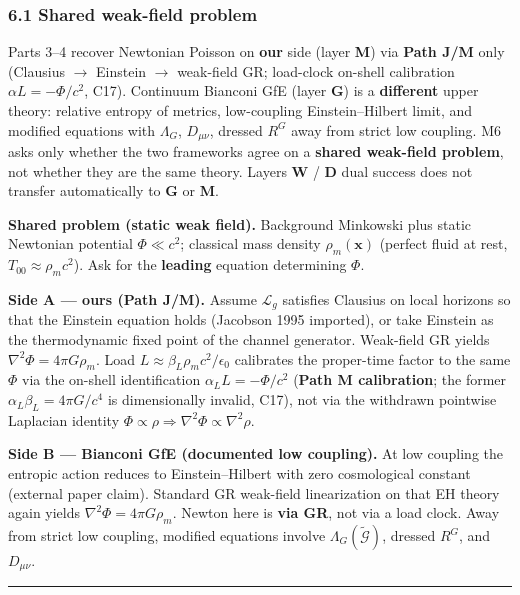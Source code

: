 \documentclass[
  11pt,
]{article}
\begin{document}
\subsubsection{6.1 Shared weak-field
problem}\label{shared-weak-field-problem}

Parts 3--4 recover Newtonian Poisson on \textbf{our} side (layer
\textbf{M}) via \textbf{Path J/M} only (Clausius $\to$ Einstein $\to$ weak-field
GR; load-clock on-shell calibration \(\alpha L=-\Phi/c^2\), C17).
Continuum Bianconi GfE (layer \textbf{G}) is a \textbf{different} upper
theory: relative entropy of metrics, low-coupling Einstein--Hilbert
limit, and modified equations with \(\Lambda_G\), \(D_{\mu\nu}\),
dressed \(R^G\) away from strict low coupling. M6 asks only whether the
two frameworks agree on a \textbf{shared weak-field problem}, not
whether they are the same theory. Layers \textbf{W} / \textbf{D} dual
success does not transfer automatically to \textbf{G} or \textbf{M}.

\textbf{Shared problem (static weak field).} Background Minkowski plus
static Newtonian potential \(\Phi\ll c^2\); classical mass density
\(\rho_m(\mathbf{x})\) (perfect fluid at rest,
\(T_{00}\approx\rho_m c^2\)). Ask for the \textbf{leading} equation
determining \(\Phi\).

\textbf{Side A --- ours (Path J/M).} Assume \(\mathcal{L}_g\) satisfies
Clausius on local horizons so that the Einstein equation holds (Jacobson
1995 imported), or take Einstein as the thermodynamic fixed point of the
channel generator. Weak-field GR yields \(\nabla^2\Phi=4\pi G\rho_m\).
Load \(L\approx\beta_L\rho_m c^2/\epsilon_0\) calibrates the proper-time
factor to the same \(\Phi\) via the on-shell identification
\(\alpha_L L=-\Phi/c^2\) (\textbf{Path M calibration}; the former
\(\alpha_L\beta_L=4\pi G/c^4\) is dimensionally invalid, C17), not via
the withdrawn pointwise Laplacian identity
\(\Phi\propto\rho\Rightarrow\nabla^2\Phi\propto\nabla^2\rho\).

\textbf{Side B --- Bianconi GfE (documented low coupling).} At low
coupling the entropic action reduces to Einstein--Hilbert with zero
cosmological constant (external paper claim). Standard GR weak-field
linearization on that EH theory again yields
\(\nabla^2\Phi=4\pi G\rho_m\). Newton here is \textbf{via GR}, not via a
load clock. Away from strict low coupling, modified equations involve
\(\Lambda_G(\tilde{\mathcal{G}})\), dressed \(R^G\), and \(D_{\mu\nu}\).

\begin{center}\rule{0.5\linewidth}{0.5pt}\end{center}
\end{document}
